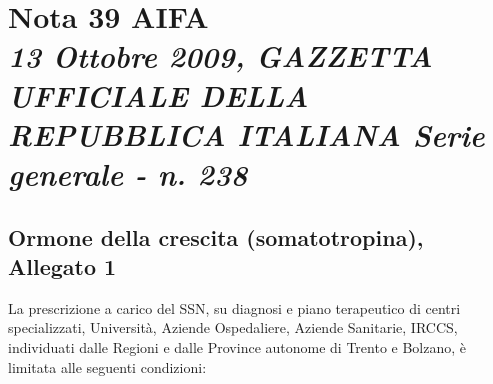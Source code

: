 \chapter[Nota 39 AIFA - 13 Ottobre 2009]
	{Nota 39 AIFA\\[.5ex]
	\normalsize\textit{13 Ottobre 2009, GAZZETTA UFFICIALE DELLA REPUBBLICA ITALIANA Serie generale - n. 238}}

\section*{Ormone della crescita (somatotropina), Allegato 1}

La prescrizione a carico del SSN, su diagnosi e piano terapeutico di centri specializzati, Universit\`a, Aziende
Ospedaliere, Aziende Sanitarie, IRCCS, individuati dalle Regioni e dalle Province autonome di Trento e
Bolzano, \`e limitata alle seguenti condizioni:


